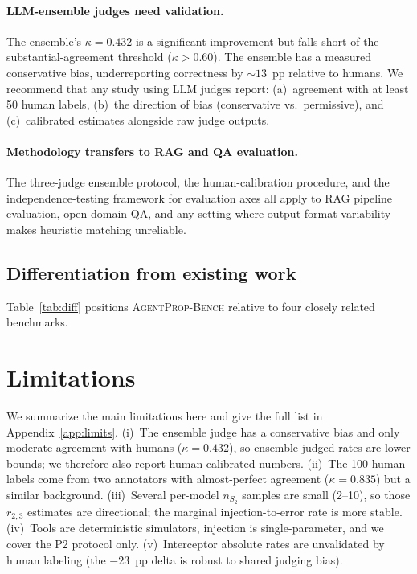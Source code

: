 \documentclass{article}
\newcommand{\bench}{\textsc{AgentProp-Bench}\xspace}
\begin{document}
\paragraph{LLM-ensemble judges need validation.}
The ensemble's $\kappa{=}0.432$ is a significant improvement but falls
short of the substantial-agreement threshold ($\kappa{>}0.60$).
The ensemble has a measured conservative bias, underreporting
correctness by ${\sim}13$~pp relative to humans.
We recommend that any study using LLM judges report: (a)~agreement with
at least 50 human labels, (b)~the direction of bias (conservative vs.\
permissive), and (c)~calibrated estimates alongside raw judge outputs.

\paragraph{Methodology transfers to RAG and QA evaluation.}
The three-judge ensemble protocol, the human-calibration procedure, and
the independence-testing framework for evaluation axes all apply to RAG
pipeline evaluation, open-domain QA, and any setting where output format
variability makes heuristic matching unreliable.

\subsection{Differentiation from existing work}

Table~\ref{tab:diff} positions \bench{} relative to four closely related
benchmarks.



\section{Limitations}
\label{sec:limits}

We summarize the main limitations here and give the full list in Appendix~\ref{app:limits}. (i)~The ensemble judge has a conservative bias and only moderate agreement with humans ($\kappa{=}0.432$), so ensemble-judged rates are lower bounds; we therefore also report human-calibrated numbers. (ii)~The 100 human labels come from two annotators with almost-perfect agreement ($\kappa{=}0.835$) but a similar background. (iii)~Several per-model $n_{S_2}$ samples are small (2--10), so those $r_{2,3}$ estimates are directional; the marginal injection-to-error rate is more stable. (iv)~Tools are deterministic simulators, injection is single-parameter, and we cover the P2 protocol only. (v)~Interceptor absolute rates are unvalidated by human labeling (the $-23$~pp delta is robust to shared judging bias).
\end{document}
